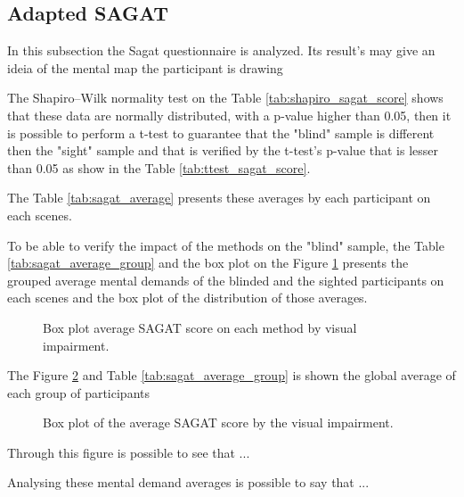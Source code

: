\subsection{Adapted SAGAT}
\label{subsec:results_adapted_sagat}

In this subsection the Sagat questionnaire is analyzed. Its result's may give an ideia of the mental map the participant is drawing

The Shapiro–Wilk normality test on the Table \ref{tab:shapiro_sagat_score} shows that these data are normally distributed, with a p-value higher than 0.05, then it is possible to perform a t-test to guarantee that the "blind" sample is different then the "sight" sample and that is verified by the t-test's p-value that is lesser than 0.05 as show in the Table \ref{tab:ttest_sagat_score}.





The Table \ref{tab:sagat_average} presents these averages by each participant on each scenes.



To be able to verify the impact of the methods on the "blind" sample, the Table \ref{tab:sagat_average_group} and the box plot on the Figure \ref{fig:boxplot_sagat_scene} presents the grouped average mental demands of the blinded and the sighted participants on each scenes and the box plot of the distribution of those averages.



\begin{figure}[!htb]
    \centering
    \resizebox{0.8\linewidth}{!}{
        
    }
    \caption{Box plot average SAGAT score on each method by visual impairment.}
    \label{fig:boxplot_sagat_scene}
\end{figure}

The Figure \ref{fig:boxplot_sagat} and Table \ref{tab:sagat_average_group} is shown the global average of each group of participants

\begin{figure}[!htb]
    \centering
    \resizebox{0.8\linewidth}{!}{
        
    }
    \caption{Box plot of the average SAGAT score by the visual impairment.}
    \label{fig:boxplot_sagat}
\end{figure}

Through this figure is possible to see that ... 

Analysing these mental demand averages is possible to say that ...

\FloatBarrier